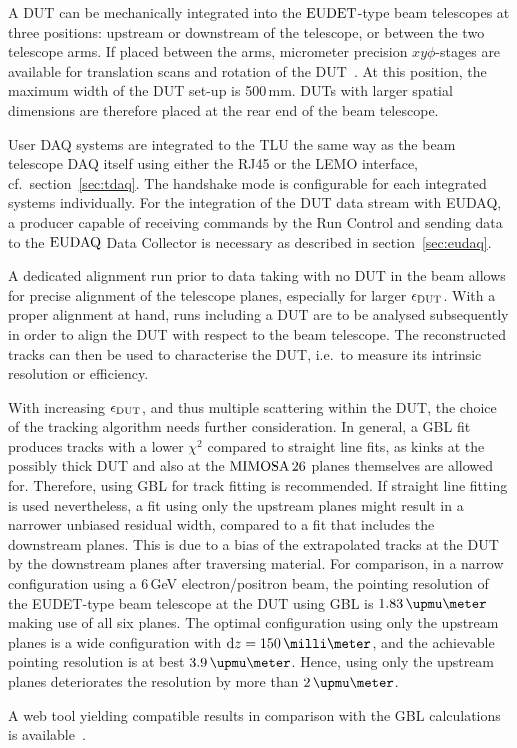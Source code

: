 A DUT can be mechanically integrated into the $\textrm{EUDET}$-type beam telescopes at three positions: upstream or downstream of the telescope, or between the two telescope arms.
If placed between the arms, micrometer precision $xy\phi$-stages are available for translation scans and rotation of the DUT~\cite{Mimosa-twiki}.
At this position, the maximum width of the DUT set-up is 500\,mm.
DUTs with larger spatial dimensions are therefore placed at the rear end of the beam telescope. 

User DAQ systems are integrated to the TLU the same way as the beam telescope DAQ itself using either the RJ45 or the LEMO interface, cf.~section~\ref{sec:tdaq}.
The handshake mode is configurable for each integrated systems individually. 
For the integration of the DUT data stream with EUDAQ, a producer capable of receiving commands by the Run Control and sending data to the $\textrm{EUDAQ}$ Data Collector is necessary
 as described in section~\ref{sec:eudaq}.

A dedicated alignment run prior to data taking with no DUT in the beam allows for precise alignment of the telescope planes, especially for larger $\mathnormal{\epsilon_{\textrm{DUT}}}$. 
With a proper alignment at hand, runs including a DUT are to be analysed subsequently in order to align the DUT with respect to the beam telescope. 
The reconstructed tracks can then be used to characterise the DUT, i.e.~to measure its intrinsic resolution or efficiency. 

With increasing $\mathnormal{\epsilon_{\textrm{DUT}}}$, and thus multiple scattering within the DUT, the choice of the tracking algorithm needs further consideration. 
In general, a GBL fit produces tracks with a lower $\chi^2$ compared to straight line fits,
 as kinks at the possibly thick DUT and also at the $\textrm{MIMOSA\,26}$ planes themselves are allowed for.
Therefore, using GBL for track fitting is recommended. 
If straight line fitting is used nevertheless, a fit using only the upstream planes might result in a narrower unbiased residual width, compared to a fit that includes the downstream planes. 
This is due to a bias of the extrapolated tracks at the DUT by the downstream planes after traversing material. 
For comparison, in a narrow configuration using a 6\,GeV electron/positron beam,
 the pointing resolution of the EUDET-type beam telescope at the DUT using GBL is $1.83\,\upmu\meter$ making use of all six planes. 
The optimal configuration using only the upstream planes is a wide configuration with $\dz = 150\,\milli\meter$,
 and the achievable pointing resolution is at best $3.9\,\upmu\meter$. 
Hence, using only the upstream planes deteriorates the resolution by more than $2\,\upmu\meter$.

A web tool yielding compatible results in comparison with the GBL calculations is available~\cite{webtool}.
